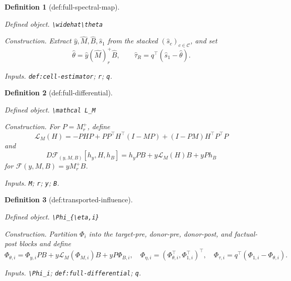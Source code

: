 \documentclass{article}
\newtheorem{definition}{Definition}
\begin{document}
\begin{definition}[def:full-spectral-map]\label{def:full-spectral-map}
\par\smallskip\noindent\emph{Defined object.} \texttt{\textbackslash{}\allowbreak{}widehat\textbackslash{}\allowbreak{}theta}
\par\smallskip\noindent\emph{Construction.} Extract \(\widehat y,\widehat M,\widehat B,\widehat s_1\) from the stacked \((\widehat s_c)_{c\in\mathcal C}\), and set \[\widehat\theta=\widehat y(\widehat M)_r^+\widehat B,\qquad \widehat\tau_R=q^\top(\widehat s_1-\widehat\theta).\]
\par\smallskip\noindent\emph{Inputs.} \texttt{def:\allowbreak{}cell-\allowbreak{}estimator}; \texttt{r}; \texttt{q}.
\end{definition}

\begin{definition}[def:full-differential]\label{def:full-differential}
\par\smallskip\noindent\emph{Defined object.} \texttt{\textbackslash{}\allowbreak{}mathcal L\_\allowbreak{}M}
\par\smallskip\noindent\emph{Construction.} For \(P=M_r^+\), define \[\mathcal L_M(H)=-PHP+PP^\top H^\top(I-MP)+(I-PM)H^\top P^\top P\] and \[D\mathcal F_{(y,M,B)}[h_y,H,h_B]=h_yPB+y\mathcal L_M(H)B+yPh_B\] for \(\mathcal F(y,M,B)=yM_r^+B\).
\par\smallskip\noindent\emph{Inputs.} \texttt{M}; \texttt{r}; \texttt{y}; \texttt{B}.
\end{definition}

\begin{definition}[def:transported-influence]\label{def:transported-influence}
\par\smallskip\noindent\emph{Defined object.} \texttt{\textbackslash{}\allowbreak{}Phi\_\allowbreak{}\{\textbackslash{}\allowbreak{}eta,\allowbreak{}i\}\allowbreak{}}
\par\smallskip\noindent\emph{Construction.} Partition \(\Phi_i\) into the target-pre, donor-pre, donor-post, and factual-post blocks and define \[\Phi_{\theta,i}=\Phi_{y,i}PB+y\mathcal L_M(\Phi_{M,i})B+yP\Phi_{B,i},\quad \Phi_{\eta,i}=(\Phi_{\theta,i}^\top,\Phi_{1,i}^\top)^\top,\quad \Phi_{\tau,i}=q^\top(\Phi_{1,i}-\Phi_{\theta,i}).\]
\par\smallskip\noindent\emph{Inputs.} \texttt{\textbackslash{}\allowbreak{}Phi\_\allowbreak{}i}; \texttt{def:\allowbreak{}full-\allowbreak{}differential}; \texttt{q}.
\end{definition}
\end{document}

